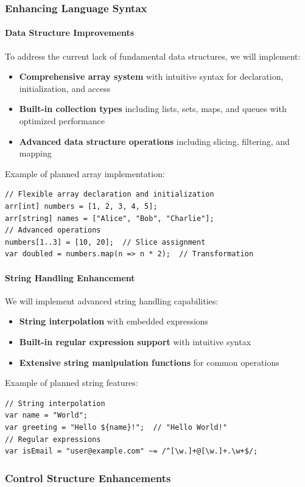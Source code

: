 \documentclass[conference]{IEEEtran}
\begin{document}
\subsubsection{Enhancing Language Syntax}
\paragraph{Data Structure Improvements}
To address the current lack of fundamental data structures, we will implement:
\begin{itemize}
\item \textbf{Comprehensive array system} with intuitive syntax for declaration, initialization, and access
\item \textbf{Built-in collection types} including lists, sets, maps, and queues with optimized performance
\item \textbf{Advanced data structure operations} including slicing, filtering, and mapping
\end{itemize}
Example of planned array implementation:
\begin{verbatim}
// Flexible array declaration and initialization
arr[int] numbers = [1, 2, 3, 4, 5];
arr[string] names = ["Alice", "Bob", "Charlie"];
// Advanced operations
numbers[1..3] = [10, 20];  // Slice assignment
var doubled = numbers.map(n => n * 2);  // Transformation
\end{verbatim}
\paragraph{String Handling Enhancement}
We will implement advanced string handling capabilities:
\begin{itemize}
\item \textbf{String interpolation} with embedded expressions
\item \textbf{Built-in regular expression support} with intuitive syntax
\item \textbf{Extensive string manipulation functions} for common operations
\end{itemize}
Example of planned string features:
\begin{verbatim}
// String interpolation
var name = "World";
var greeting = "Hello ${name}!";  // "Hello World!"
// Regular expressions
var isEmail = "user@example.com" ~= /^[\w.]+@[\w.]+.\w+$/;
\end{verbatim}
\subsubsection{Control Structure Enhancements}
\end{document}
